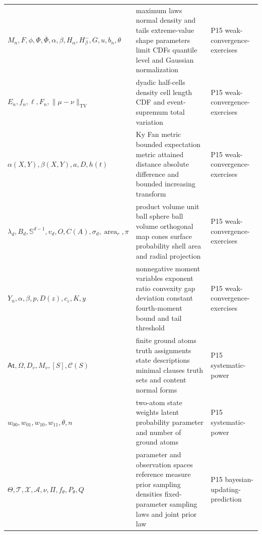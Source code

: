 \begin{longtable}{@{}p{}p{}p{}@{}}
\(M_n,\allowbreak F,\allowbreak \phi,\allowbreak \Phi,\allowbreak \overline\Phi,\allowbreak \alpha,\allowbreak \beta,\allowbreak H_\alpha,\allowbreak H_\beta^-,\allowbreak G,\allowbreak u,\allowbreak b_n,\allowbreak \theta\) & maximum laws normal density and tails extreme-value shape parameters limit CDFs quantile level and Gaussian normalization & P15 weak-\allowbreak{}convergence-\allowbreak{}exercises \\
\(E_n,\allowbreak f_n,\allowbreak \ell,\allowbreak F_n,\allowbreak \|\mu-\nu\|_{\mathrm{TV}}\) & dyadic half-cells density cell length CDF and event-supremum total variation & P15 weak-\allowbreak{}convergence-\allowbreak{}exercises \\
\(\alpha(X,\allowbreak Y),\allowbreak \beta(X,\allowbreak Y),\allowbreak a,\allowbreak D,\allowbreak h(t)\) & Ky Fan metric bounded expectation metric attained distance absolute difference and bounded increasing transform & P15 weak-\allowbreak{}convergence-\allowbreak{}exercises \\
\(\lambda_d,\allowbreak B_d,\allowbreak \mathbb S^{d-1},\allowbreak v_d,\allowbreak O,\allowbreak C(A),\allowbreak \sigma_d,\allowbreak \operatorname{area}_r,\allowbreak \pi\) & product volume unit ball sphere ball volume orthogonal map cones surface probability shell area and radial projection & P15 weak-\allowbreak{}convergence-\allowbreak{}exercises \\
\(Y_n,\allowbreak \alpha,\allowbreak \beta,\allowbreak p,\allowbreak D(z),\allowbreak c_\varepsilon,\allowbreak K,\allowbreak y\) & nonnegative moment variables exponent ratio convexity gap deviation constant fourth-moment bound and tail threshold & P15 weak-\allowbreak{}convergence-\allowbreak{}exercises \\
\(\mathsf{At},\allowbreak \Omega,\allowbreak D_v,\allowbreak M_v,\allowbreak [S],\allowbreak \mathcal C(S)\) & finite ground atoms truth assignments state descriptions minimal clauses truth sets and content normal forms & P15 systematic-\allowbreak{}power \\
\(w_{00},\allowbreak w_{01},\allowbreak w_{10},\allowbreak w_{11},\allowbreak \theta,\allowbreak n\) & two-atom state weights latent probability parameter and number of ground atoms & P15 systematic-\allowbreak{}power \\
\(\Theta,\allowbreak \mathcal T,\allowbreak \mathcal X,\allowbreak \mathcal A,\allowbreak \nu,\allowbreak \Pi,\allowbreak f_\theta,\allowbreak P_\theta,\allowbreak Q\) & parameter and observation spaces reference measure prior sampling densities fixed-parameter sampling laws and joint prior law & P15 bayesian-\allowbreak{}updating-\allowbreak{}prediction \\

\end{longtable}
